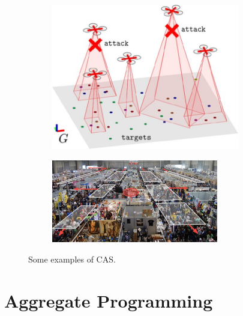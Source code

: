 \documentclass[12pt,a4paper,openright,twoside]{book}
\begin{document}
\begin{figure}[H]
  \centering
  \begin{subfigure}[b]{0.49\textwidth}
      \centering
      \includegraphics[width=0.9\textwidth]{figures/swarm2.jpeg}
  \end{subfigure}

  \begin{subfigure}[b]{0.49\textwidth}
      \centering
      \includegraphics[width=0.8\textwidth]{figures/crowd.png}
  \end{subfigure}
  \caption{Some examples of CAS.}
\end{figure}

\section{Aggregate Programming}
\end{document}
